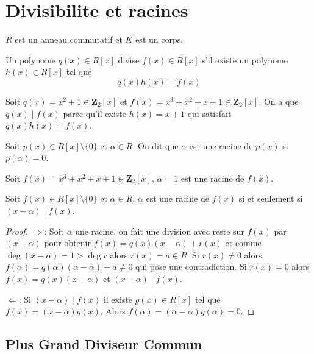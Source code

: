 \section{Divisibilite et racines}

\begin{notation}
$R$  est un anneau commutatif et $K$ est un corps.
\end{notation}
\begin{definition}[Divisibilite]
Un polynome $q(x)\in R[x]$ divise $f(x)\in R[x]$ s'il existe un polynome $h(x)\in R[x]$ tel que 
$$
q(x)h(x)=f(x)
$$
\end{definition}
\begin{example}
Soit $q(x)=x^{2}+1\in \mathbf{Z}_{2}[x]$ et $f(x)=x^{3}+x^{2}-x+1 \in \mathbf{Z}_{2}[x]$. On a que $q(x)\mid f(x)$ parce qu'il existe $h(x)=x+1$ qui satisfait $q(x)h(x)=f(x)$. 
\end{example}
\begin{definition}
Soit $p(x)\in R[x]\setminus \{ 0 \}$ et $\alpha \in R$. On dit que $\alpha$ est une racine de $p(x)$ si $p(\alpha)=0$. 
\end{definition}
\begin{example}
Soit $f(x)=x^{3}+x^{2}+x+1\in \mathbf{Z}_{2}[x]$, $\alpha=1$ est une racine de $f(x)$.
\end{example}
\begin{theorem}
Soit $f(x)\in R[x]\setminus \{ 0 \}$ et $\alpha \in R$. $\alpha$ est une racine de $f(x)$ si et seulement si $(x-\alpha)\mid f(x)$.
\end{theorem}
\begin{proof}
$\Rightarrow$: Soit $\alpha$ une racine, on fait une division avec reste sur $f(x)$ par $(x-\alpha)$ pour obtenir $f(x)=q(x)(x-\alpha)+r(x)$ et comme $\deg(x-\alpha)=1>\deg r$ alors $r(x)=a\in R$. Si $r(x)\neq 0$ alors $f(\alpha)=q(\alpha)(\alpha-\alpha)+a\neq0$ qui pose une contradiction. Si $r(x)=0$ alors $f(x)=q(x)(x-\alpha)$ et $(x-\alpha)\mid f(x)$.

$\Leftarrow$: Si $(x-\alpha)\mid f(x)$ il existe $g(x)\in R[x]$ tel que $f(x)=(x-\alpha)g(x)$. Alors $f(\alpha)=(\alpha-\alpha)g(\alpha)=0$.
\end{proof}
\subsection{Plus Grand Diviseur Commun}

